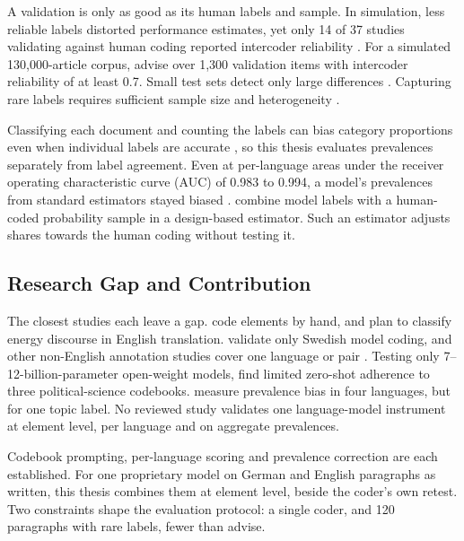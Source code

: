 A validation is only as good as its human labels and sample. In simulation, less reliable labels distorted performance estimates, yet only 14 of 37 studies validating against human coding reported intercoder reliability \parencite[pp.~554, 560]{song2020validations}. For a simulated 130{,}000-article corpus, \textcite[p.~564]{song2020validations} advise over 1{,}300 validation items with intercoder reliability of at least 0.7. Small test sets detect only large differences \parencite{card2020littlepower}. Capturing rare labels requires sufficient sample size and heterogeneity \parencite[p.~106]{feuerriegel2025nlptextdata}.

Classifying each document and counting the labels can bias category proportions even when individual labels are accurate \parencite[p.~229]{hopkins2010method}, so this thesis evaluates prevalences separately from label agreement. Even at per-language areas under the receiver operating characteristic curve (AUC) of 0.983 to 0.994, a model's prevalences from standard estimators stayed biased \parencite[pp.~7--8]{linder2026multicalibrated}. \textcite{egami2023dsl} combine model labels with a human-coded probability sample in a design-based estimator. Such an estimator adjusts shares towards the human coding without testing it.

\subsection{Research Gap and Contribution}\label{subsec:research_gap}

The closest studies each leave a gap. \textcite{ali2025hydrogenframing} code elements by hand, and \textcite{toetzke2022energydiscourse} plan to classify energy discourse in English translation. \textcite{lupo2024humanlevelcoding} validate only Swedish model coding, and other non-English annotation studies cover one language or pair \parencite{nemkova2025annotationskills,hohenwalde2025chatgptactors}. Testing only 7--12-billion-parameter open-weight models, \textcite[p.~188]{halterman2026codebookllms} find limited zero-shot adherence to three political-science codebooks. \textcite{linder2026multicalibrated} measure prevalence bias in four languages, but for one topic label. No reviewed study validates one language-model instrument at element level, per language and on aggregate prevalences.

Codebook prompting, per-language scoring and prevalence correction are each established. For one proprietary model on German and English paragraphs as written, this thesis combines them at element level, beside the coder's own retest. Two constraints shape the evaluation protocol: a single coder, and 120 paragraphs with rare labels, fewer than \textcite[p.~564]{song2020validations} advise.
